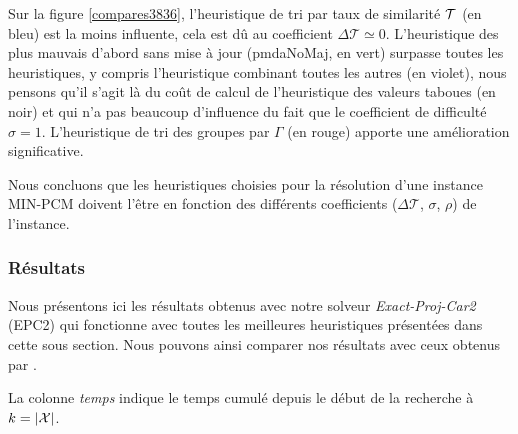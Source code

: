 Sur la figure \ref{compares3836}, l'heuristique de tri par taux de similarité $\cal{T}$ (en bleu) est la moins influente, cela est dû au coefficient $\Delta\mathcal{T} \simeq 0$. L'heuristique des plus mauvais d'abord sans mise à jour (pmdaNoMaj, en vert) surpasse toutes les heuristiques, y compris l'heuristique combinant toutes les autres (en violet), nous pensons qu'il s'agit là du coût de calcul de l'heuristique des valeurs taboues (en noir) et qui n'a pas beaucoup d'influence du fait que le coefficient de difficulté $\sigma = 1$. L'heuristique de tri des groupes par $\Gamma$ (en rouge) apporte une amélioration significative.

Nous concluons que les heuristiques choisies pour la résolution d'une instance MIN-PCM doivent l'être en fonction des différents coefficients ($\Delta\mathcal{T}$, $\sigma$, $\rho$) de l'instance.

\subsubsection{Résultats}

Nous présentons ici les résultats obtenus avec notre solveur \emph{Exact-Proj-Car2} (EPC2) qui fonctionne avec toutes les meilleures heuristiques présentées dans cette sous section. Nous pouvons ainsi comparer nos résultats avec ceux obtenus par \cite{Chhel2013}.

La colonne \textit{temps} indique le temps cumulé depuis le début de la recherche à $k=|\cal{X}|$.

